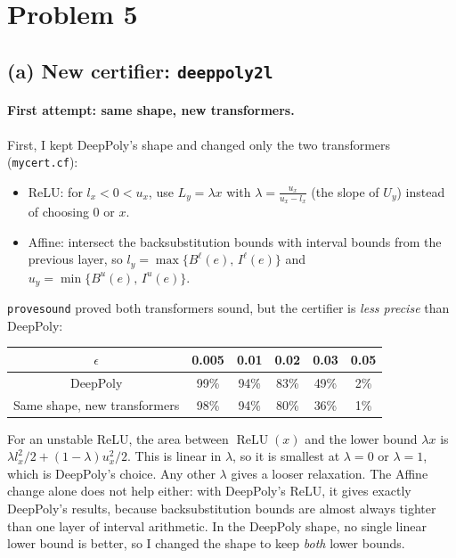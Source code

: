 
\section*{Problem 5}

\subsection*{(a) New certifier: \texttt{deeppoly2l}}

\paragraph{First attempt: same shape, new transformers.}
First, I kept DeepPoly's shape and changed only the two transformers
(\texttt{mycert.cf}):
\begin{itemize}
  \item ReLU: for $l_x<0<u_x$, use $L_y=\lambda x$ with
        $\lambda=\frac{u_x}{u_x-l_x}$ (the slope of $U_y$) instead of
        choosing $0$ or $x$.
  \item Affine: intersect the backsubstitution bounds with interval
        bounds from the previous layer, so
        $l_y=\max\{B^\ell(e),\,I^\ell(e)\}$ and
        $u_y=\min\{B^u(e),\,I^u(e)\}$.
\end{itemize}
\texttt{provesound} proved both transformers sound, but the certifier
is \emph{less precise} than DeepPoly:
\begin{center}
\begin{tabular}{|c|c|c|c|c|c|}
\hline
$\epsilon$ & 0.005 & 0.01 & 0.02 & 0.03 & 0.05 \\
\hline
DeepPoly & 99\% & 94\% & 83\% & 49\% & 2\% \\
Same shape, new transformers & 98\% & 94\% & 80\% & 36\% & 1\% \\
\hline
\end{tabular}
\end{center}
For an unstable ReLU, the area between $\operatorname{ReLU}(x)$ and the
lower bound $\lambda x$ is $\lambda l_x^2/2+(1-\lambda)u_x^2/2$. This is
linear in $\lambda$, so it is smallest at $\lambda=0$ or $\lambda=1$,
which is DeepPoly's choice. Any other $\lambda$ gives a looser
relaxation. The Affine change alone does not help either: with
DeepPoly's ReLU, it gives exactly DeepPoly's results, because
backsubstitution bounds are almost always tighter than one layer of
interval arithmetic. In the DeepPoly shape, no single linear lower
bound is better, so I changed the shape to keep \emph{both} lower
bounds.

